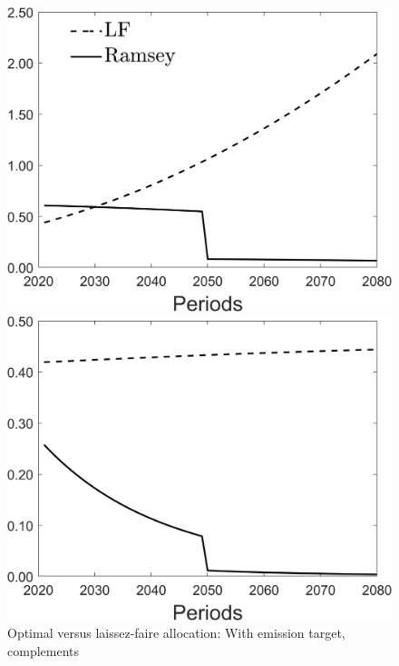 \begin{figure}[h!!]
	\centering
	\caption{Optimal versus laissez-faire allocation: With emission target, complements }\label{fig:optallo_comp_target}
	\begin{minipage}[]{0.32\textwidth}
		\includegraphics[width=1\textwidth]{../../codding_model/Own/figures/Rep_agent/staticRam_LF_separate_c_periods59_eppsilon0.40_zeta1.40_Ad08_Ac04_thetac0.70_thetad0.56_HetGrowth1_tauul0.181_util0_withtarget1_lgd1.png}
	\end{minipage}
	\begin{minipage}[]{0.32\textwidth}
		\includegraphics[width=1\textwidth]{../../codding_model/Own/figures/Rep_agent/staticRam_LF_separate_hh_periods59_eppsilon0.40_zeta1.40_Ad08_Ac04_thetac0.70_thetad0.56_HetGrowth1_tauul0.181_util0_withtarget1_lgd0.png}

\end{minipage}
\end{figure}
